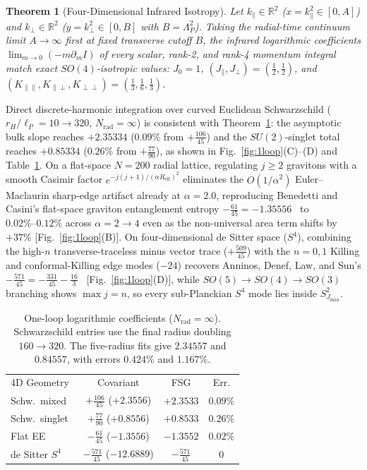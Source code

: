 \documentclass[onecolumn,11pt,aps,prd,amsmath,amssymb,nofootinbib,floatfix]{revtex4-2}
\newtheorem{theorem}{Theorem}
\newcommand{\lP}{\ell_P}
\begin{document}
\begin{theorem}[Four-Dimensional Infrared Isotropy]\label{thm:isotropy}
Let $k_\parallel\in\mathbb{R}^2$ ($x=k_\parallel^2\in[0,A]$) and $k_\perp\in\mathbb{R}^2$ ($y=k_\perp^2\in[0,B]$ with $B=\Lambda_P^2$). Taking the radial-time continuum limit $A\to\infty$ first at fixed transverse cutoff $B$, the infrared logarithmic coefficients $\lim_{m\to 0}(-m\partial_m I)$ of every scalar, rank-2, and rank-4 momentum integral match exact $SO(4)$-isotropic values: $J_0=1$, $(J_\parallel,J_\perp)=(\frac{1}{2},\frac{1}{2})$, and $(K_{\parallel\parallel},K_{\parallel\perp},K_{\perp\perp})=(\frac{1}{3},\frac{1}{6},\frac{1}{3})$.
\end{theorem}

Direct discrete-harmonic integration over curved Euclidean Schwarzschild ($r_H/\lP=10\to 320$, $N_{\mathrm{rad}}=\infty$) is consistent with Theorem~\ref{thm:isotropy}: the asymptotic bulk slope reaches $+2.35334$ ($0.09\%$ from $+\frac{106}{45}$) and the $SU(2)$-singlet total reaches $+0.85334$ ($0.26\%$ from $+\frac{77}{90}$), as shown in Fig.~\ref{fig:1loop}(C)--(D) and Table~\ref{tab:1loop}. On a flat-space $N=200$ radial lattice, regulating $j\ge 2$ gravitons with a smooth Casimir factor $e^{-j(j+1)/(\alpha R_{\mathrm{eff}})^2}$ eliminates the $O(1/\alpha^2)$ Euler--Maclaurin sharp-edge artifact already at $\alpha=2.0$, reproducing Benedetti and Casini's flat-space graviton entanglement entropy $-\frac{61}{45}=-1.35556$~\cite{BenedettiCasini2020} to $0.02\%\text{--}0.12\%$ across $\alpha=2\to 4$ even as the non-universal area term shifts by $+37\%$ [Fig.~\ref{fig:1loop}(B)]. On four-dimensional de Sitter space ($S^4$), combining the high-$n$ transverse-traceless minus vector trace ($+\frac{509}{45}$) with the $n=0,1$ Killing and conformal-Killing edge modes ($-24$) recovers Anninos, Denef, Law, and Sun's $-\frac{571}{45}=-\frac{331}{45}-\frac{16}{3}$~\cite{ADLS2022} [Fig.~\ref{fig:1loop}(D)], while $SO(5)\to SO(4)\to SO(3)$ branching shows $\max j=n$, so every sub-Planckian $S^4$ mode lies inside $S^2_{J_{\max}}$.

\begin{table}[t]
\caption{One-loop logarithmic coefficients ($N_{\mathrm{rad}}=\infty$). Schwarzschild entries use the final radius doubling $160\to320$. The five-radius fits give $2.34557$ and $0.84557$, with errors $0.424\%$ and $1.167\%$.}
\label{tab:1loop}
\begin{ruledtabular}
\begin{tabular}{lccc}
4D Geometry & Covariant & FSG & Err. \\
\colrule
Schw.\ mixed~\cite{Sen2013} & $+\frac{106}{45}$ ($+2.3556$) & $+2.3533$ & $0.09\%$ \\
Schw.\ singlet~\cite{Sen2013} & $+\frac{77}{90}$ ($+0.8556$) & $+0.8533$ & $0.26\%$ \\
Flat EE~\cite{BenedettiCasini2020} & $-\frac{61}{45}$ ($-1.3556$) & $-1.3552$ & $0.02\%$ \\
de Sitter $S^4$~\cite{ADLS2022} & $-\frac{571}{45}$ ($-12.6889$) & $-\frac{571}{45}$ & $0$ \\
\end{tabular}
\end{ruledtabular}
\end{table}
\end{document}
